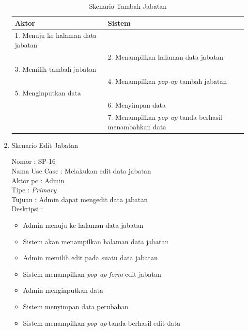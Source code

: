 \begin{enumerate}
\begin{itemize}
\end{itemize}

\begin{table}
	\caption{Skenario Tambah Jabatan}
	\centering
	\begin{tabular}{ | l | p{68.5mm} |}
		\hline 
		\textbf{Aktor} & \textbf{Sistem} \\
		\hline
		
		1.	Menuju ke halaman data jabatan &  \\
		
		\hline
		
		&  2.	Menampilkan halaman data jabatan \\
		
		\hline
		
		3. Memilih tambah jabatan & \\
		
		\hline
		
		& 4.	Menampilkan \textit{pop-up} tambah jabatan \\
		
		\hline
		
		5.	Menginputkan data  & \\
		\hline
		
		& 6.	Menyimpan data \\
		\hline
		
		& 7.	Menampilkan \textit{pop-up} tanda berhasil menambahkan data \\
		\hline
		
	\end{tabular}
\end{table}

\item Skenario Edit Jabatan

Nomor \kern 3.6pc : SP-16 \\
Nama Use Case : Melakukan edit data jabatan \\
Aktor  pc : Admin \\
Tipe \kern 4.6pc : \textit{Primary} \\
Tujuan \kern 3.6pc : Admin dapat mengedit data jabatan \\
Deskripsi \kern 2.5pc : 

\begin{itemize}
	\item Admin menuju ke halaman data jabatan
	\item Sistem akan menampilkan halaman data jabatan
	\item Admin memilih edit pada suatu data jabatan
	\item Sistem menampilkan \textit{pop-up form} edit jabatan
	\item Admin menginputkan data
	\item Sistem menyimpan data perubahan
	\item Sistem menampilkan \textit{pop-up} tanda berhasil edit data
	

\end{itemize}
\end{enumerate}
